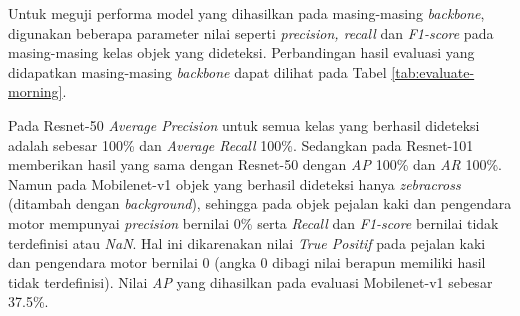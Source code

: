 Untuk meguji performa model yang dihasilkan pada masing-masing \textit{backbone}, digunakan beberapa parameter nilai seperti \textit{precision, recall} dan \textit{F1-score} pada masing-masing kelas objek yang dideteksi. Perbandingan hasil evaluasi yang didapatkan masing-masing \textit{backbone} dapat dilihat pada Tabel \ref{tab:evaluate-morning}.

Pada Resnet-50 \textit{Average Precision} untuk semua kelas yang berhasil dideteksi adalah sebesar 100\% dan \textit{Average Recall} 100\%. Sedangkan pada Resnet-101 memberikan hasil yang sama dengan Resnet-50 dengan \textit{AP} 100\% dan \textit{AR} 100\%. Namun pada Mobilenet-v1 objek yang berhasil dideteksi hanya \textit{zebracross} (ditambah dengan \textit{background}), sehingga pada objek pejalan kaki dan pengendara motor mempunyai \textit{precision} bernilai 0\% serta \textit{Recall} dan \textit{F1-score} bernilai tidak terdefinisi atau \textit{NaN}. Hal ini dikarenakan nilai \textit{True Positif} pada pejalan kaki dan pengendara motor bernilai 0 (angka 0 dibagi nilai berapun memiliki hasil tidak terdefinisi). Nilai \textit{AP} yang dihasilkan pada evaluasi Mobilenet-v1 sebesar 37.5\%.


